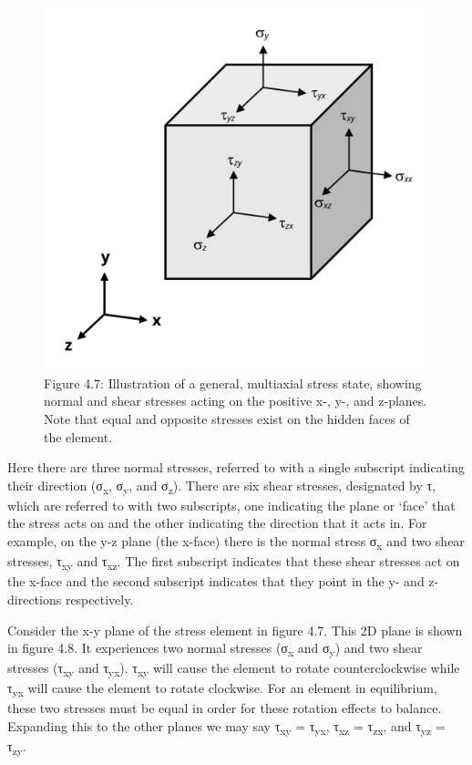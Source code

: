 \documentclass[
  letterpaper,
  DIV=11,
  numbers=noendperiod]{scrreprt}
\theoremstyle{definition}
\theoremstyle{remark}
\begin{document}
\begin{figure}[H]

{\centering \includegraphics[width=4.40625in,height=\textheight]{images/CH4 PNGs/4.7.png}

}

\caption{Figure 4.7: Illustration of a general, multiaxial stress state,
showing normal and shear stresses acting on the positive x-, y-, and
z-planes. Note that equal and opposite stresses exist on the hidden
faces of the element.}

\end{figure}%

Here there are three normal stresses, referred to with a single
subscript indicating their direction (σ\textsubscript{x},
σ\textsubscript{y}, and σ\textsubscript{z}). There are six shear
stresses, designated by τ, which are referred to with two subscripts,
one indicating the plane or `face' that the stress acts on and the other
indicating the direction that it acts in. For example, on the y-z plane
(the x-face) there is the normal stress σ\textsubscript{x} and two shear
stresses, τ\textsubscript{xy} and τ\textsubscript{xz}. The first
subscript indicates that these shear stresses act on the x-face and the
second subscript indicates that they point in the y- and z-directions
respectively.

Consider the x-y plane of the stress element in figure 4.7. This 2D
plane is shown in figure 4.8. It experiences two normal stresses
(σ\textsubscript{x} and σ\textsubscript{y}) and two shear stresses
(τ\textsubscript{xy} and τ\textsubscript{yx}). τ\textsubscript{xy} will
cause the element to rotate counterclockwise while τ\textsubscript{yx}
will cause the element to rotate clockwise. For an element in
equilibrium, these two stresses must be equal in order for these
rotation effects to balance. Expanding this to the other planes we may
say τ\textsubscript{xy} = τ\textsubscript{yx}, τ\textsubscript{xz} =
τ\textsubscript{zx}, and τ\textsubscript{yz} = τ\textsubscript{zy}.
\end{document}
